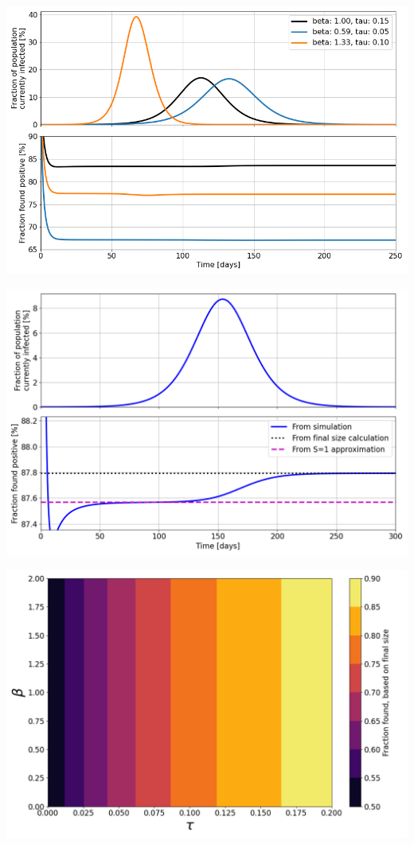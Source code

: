 \documentclass[10pt,a4paper,landscape]{article}
\begin{document}
\includegraphics[width=0.98\linewidth]{TestIntensity_ExampleTestRatioMultiple.png}

\includegraphics[width=0.98\linewidth]{TestIntensity_ExampleTestRatioWithLevels.png}

\includegraphics[width=0.98\linewidth]{TestIntensity_RatioFinal.png}
\end{document}
